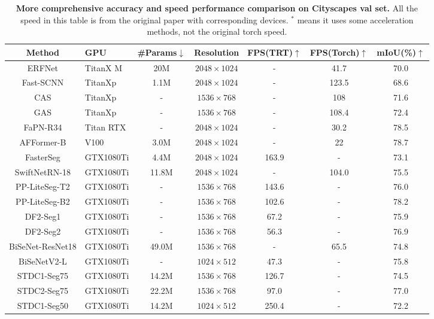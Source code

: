 \documentclass[letterpaper]{article} %
\begin{document}
\begin{table}[t]
  \caption{\textbf{ More comprehensive accuracy and speed performance comparison on Cityscapes val set.} All the speed in this table is from the original paper with corresponding devices. $^*$ means it uses some acceleration methods, not the original torch speed.
  }
  \label{tab:Sup_overall}
    \centering
  \begin{tabular}{c|l|c|c|c|c|c}%
    \Xhline{1pt}
    Method & GPU &\#Params$\downarrow$ &Resolution &FPS(TRT)$\uparrow$ &FPS(Torch)$\uparrow$ &mIoU(\%)$\uparrow$ \\
    \hline
    ERFNet  &TitanX M   &20M &$2048 \times 1024$ &- &41.7 &70.0\\
    Fast-SCNN  &TitanXp   &1.1M  &$2048 \times 1024$ &- &123.5 &68.6\\
    CAS  &TitanXp   &-  &$1536 \times 768$ &- &108 &71.6\\
    GAS  &TitanXp   &-  &$1536 \times 768$ &- &108.4 &72.4\\
    FaPN-R34  &Titan RTX   &-  &$2048 \times 1024$ &- &30.2 &78.5\\
    AFFormer-B &V100 &3.0M &$2048 \times 1024$ &- &22 &78.7 \\
    \hline
    FasterSeg &GTX1080Ti  &4.4M &$2048 \times 1024$ &163.9 &- &73.1 \\
    SwiftNetRN-18 &GTX1080Ti  &11.8M &$2048 \times 1024$ &- &104.0 &75.5 \\
    PP-LiteSeg-T2  &GTX1080Ti     &-  &$1536 \times 768$  &143.6 &- &76.0\\
    PP-LiteSeg-B2  &GTX1080Ti     &-  &$1536 \times 768$  &102.6 &- &78.2\\
    DF2-Seg1  &GTX1080Ti  &-  &$1536 \times 768$     &67.2 &- &75.9  \\
    DF2-Seg2  &GTX1080Ti  &-  &$1536 \times 768$     &56.3 &- &76.9  \\
    BiSeNet-ResNet18  &GTX1080Ti  &49.0M  &$1536 \times 768$     &- &65.5 &74.8  \\
    BiSeNetV2-L      &GTX1080Ti   &-      &$1024 \times 512$    &47.3 &-    &75.8   \\
    STDC1-Seg75 &GTX1080Ti &14.2M &$1536 \times 768$ &126.7 &- &74.5 \\
    STDC2-Seg75 &GTX1080Ti &22.2M &$1536 \times 768$ &97.0 &-  &77.0 \\
    STDC1-Seg50 &GTX1080Ti &14.2M &$1024 \times 512$ &250.4 &- &72.2 \\

\end{tabular}
\end{table}
\end{document}
